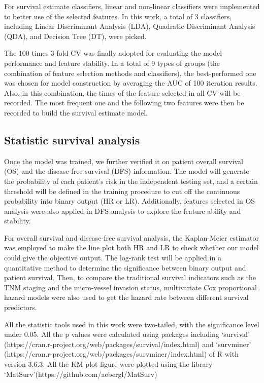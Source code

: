 \documentclass[num-refs]{wiley-article}
\begin{document}
For survival estimate classifiers, linear and non-linear classifiers were implemented to better use of the selected features. In this work, a total of 3 classifiers, including Linear Discriminant Analysis (LDA), Quadratic Discriminant Analysis (QDA), and Decision Tree (DT), were picked. 

The 100 times 3-fold CV was finally adopted for evaluating the model performance and feature stability. In a total of 9 types of groups (the combination of feature selection methods and classifiers), the best-performed one was chosen for model construction by averaging the AUC of 100 iteration results. Also, in this combination, the times of the feature selected in all CV will be recorded. The most frequent one and the following two features were then be recorded to build the survival estimate model.

\subsection{Statistic survival analysis}
Once the model was trained, we further verified it on patient overall survival (OS) and the disease-free survival (DFS) information. The model will generate the probability of each patient's risk in the independent testing set, and a certain threshold will be defined in the training procedure to cut off the continuous probability into binary output (HR or LR). Additionally, features selected in OS analysis were also applied in DFS analysis to explore the feature ability and stability.

For overall survival and disease-free survival analysis, the Kaplan-Meier estimator was employed to make the line plot both HR and LR to check whether our model could give the objective output. The log-rank test will be applied in a quantitative method to determine the significance between binary output and patient survival. Then, to compare the traditional survival indicators such as the TNM staging and the micro-vessel invasion status, multivariate Cox proportional hazard models were also used to get the hazard rate between different survival predictors. 

All the statistic tools used in this work were two-tailed, with the significance level under 0.05. All the p values were calculated using packages including ‘survival’ (https://cran.r-project.org/web/packages/survival/index.html) and ‘survminer’ (https://cran.r-project.org/web/packages/survminer/index.html) of R with version 3.6.3. All the KM plot figure were plotted using the library ‘MatSurv’(https://github.com/aebergl/MatSurv)
\end{document}
